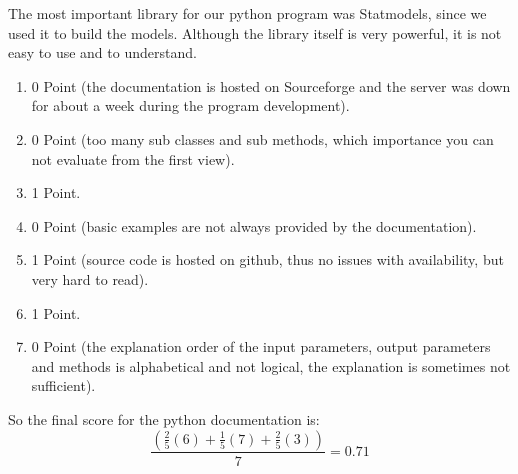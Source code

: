 \documentclass{article}
\begin{document}
The most important library for our python program was Statmodels, since we used it to build the models. Although the library itself is very powerful, it is not easy to use and to understand.
\begin{enumerate}
    \item 0 Point (the documentation is hosted on Sourceforge and the server was down for about a week during the program development).
    \item 0 Point (too many sub classes and sub methods, which importance you can not evaluate from the first view).
    \item 1 Point.
    \item 0 Point (basic examples are not always provided by the documentation).
    \item 1 Point (source code is hosted on github, thus no issues with availability, but very hard to read).
    \item 1 Point.
    \item 0 Point (the explanation order of the input parameters, output parameters and methods is alphabetical and not logical, the explanation is sometimes not sufficient).
\end{enumerate}
So the final score for the python documentation is:
\[ \frac{(\frac{2}{5}(6) + \frac{1}{5}(7) + \frac{2}{5}(3) )}{7}= 0.71\]
\end{document}
